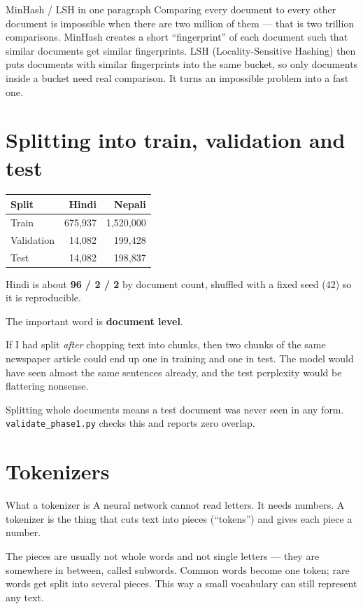 \documentclass[11pt]{report}
\newcommand{\p}[1]{\texttt{#1}}
\begin{document}
\begin{concept}{MinHash / LSH in one paragraph}
Comparing every document to every other document is impossible when there are
two million of them --- that is two trillion comparisons. MinHash creates a
short ``fingerprint'' of each document such that similar documents get similar
fingerprints. LSH (Locality-Sensitive Hashing) then puts documents with similar
fingerprints into the same bucket, so only documents inside a bucket need real
comparison. It turns an impossible problem into a fast one.
\end{concept}

\section{Splitting into train, validation and test}

\begin{center}
\begin{tabular}{@{}lrr@{}}
\toprule
\textbf{Split} & \textbf{Hindi} & \textbf{Nepali} \\
\midrule
Train & 675,937 & 1,520,000 \\
Validation & 14,082 & 199,428 \\
Test & 14,082 & 198,837 \\
\bottomrule
\end{tabular}
\end{center}

Hindi is about \textbf{96 / 2 / 2} by document count, shuffled with a fixed seed
(42) so it is reproducible.

\begin{warnbox}
The important word is \textbf{document level}.

If I had split \emph{after} chopping text into chunks, then two chunks of the
same newspaper article could end up one in training and one in test. The model
would have seen almost the same sentences already, and the test perplexity would
be flattering nonsense.

Splitting whole documents means a test document was never seen in any form.
\p{validate\_phase1.py} checks this and reports zero overlap.
\end{warnbox}

\section{Tokenizers}

\begin{concept}{What a tokenizer is}
A neural network cannot read letters. It needs numbers. A tokenizer is the thing
that cuts text into pieces (``tokens'') and gives each piece a number.

The pieces are usually not whole words and not single letters --- they are
somewhere in between, called subwords. Common words become one token; rare
words get split into several pieces. This way a small vocabulary can still
represent any text.
\end{concept}
\end{document}
